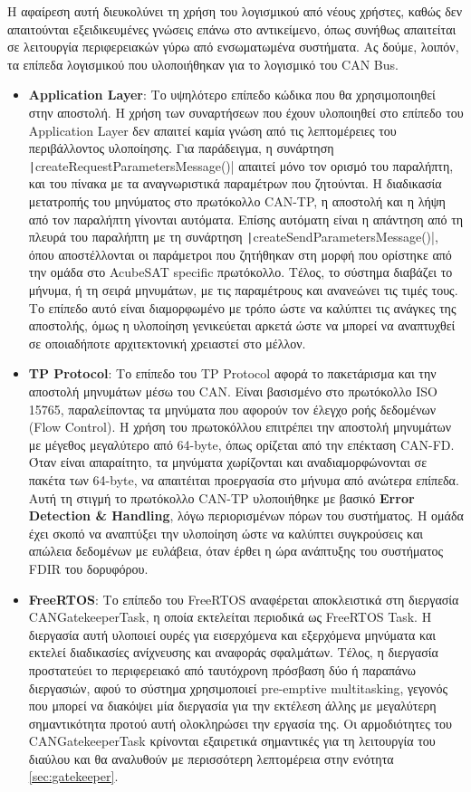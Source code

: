 \documentclass[a4paper,nobib,justified]{tufte-book}
\begin{document}
Η αφαίρεση αυτή διευκολύνει τη χρήση του λογισμικού από νέους χρήστες, καθώς δεν απαιτούνται εξειδικευμένες γνώσεις επάνω στο αντικείμενο, όπως συνήθως απαιτείται σε λειτουργία περιφερειακών γύρω από ενσωματωμένα συστήματα. Ας δούμε, λοιπόν, τα επίπεδα λογισμικού που υλοποιήθηκαν για το λογισμικό του CAN Bus.

\begin{itemize}
	\item \textbf{Application Layer}: Το υψηλότερο επίπεδο κώδικα που θα χρησιμοποιηθεί στην αποστολή. Η χρήση των συναρτήσεων που έχουν υλοποιηθεί στο επίπεδο του Application Layer δεν απαιτεί καμία γνώση από τις λεπτομέρειες του περιβάλλοντος υλοποίησης. Για παράδειγμα, η συνάρτηση \texttt|createRequestParametersMessage()| απαιτεί μόνο τον ορισμό του παραλήπτη, και του πίνακα με τα αναγνωριστικά παραμέτρων που ζητούνται. Η διαδικασία μετατροπής του μηνύματος στο πρωτόκολλο CAN-TP, η αποστολή και η λήψη από τον παραλήπτη γίνονται αυτόματα. Επίσης αυτόματη είναι η απάντηση από τη πλευρά του παραλήπτη με τη συνάρτηση \texttt|createSendParametersMessage()|, όπου αποστέλλονται οι παράμετροι που ζητήθηκαν στη μορφή που ορίστηκε από την ομάδα στο AcubeSAT specific πρωτόκολλο. Τέλος, το σύστημα διαβάζει το μήνυμα, ή τη σειρά μηνυμάτων, με τις παραμέτρους και ανανεώνει τις τιμές τους. Το επίπεδο αυτό είναι διαμορφωμένο με τρόπο ώστε να καλύπτει τις ανάγκες της αποστολής, όμως η υλοποίηση γενικεύεται αρκετά ώστε να μπορεί να αναπτυχθεί σε οποιαδήποτε αρχιτεκτονική χρειαστεί στο μέλλον.
	\item \textbf{TP Protocol}: Το επίπεδο του TP Protocol αφορά το πακετάρισμα και την αποστολή μηνυμάτων μέσω του CAN. Είναι βασισμένο στο πρωτόκολλο ISO 15765, παραλείποντας τα μηνύματα που αφορούν τον έλεγχο ροής δεδομένων (Flow Control). Η χρήση του πρωτοκόλλου επιτρέπει την αποστολή μηνυμάτων με μέγεθος μεγαλύτερο από 64-byte, όπως ορίζεται από την επέκταση CAN-FD. Όταν είναι απαραίτητο, τα μηνύματα χωρίζονται και αναδιαμορφώνονται σε πακέτα των 64-byte, να απαιτέιται προεργασία στο μήνυμα από ανώτερα επίπεδα. Αυτή τη στιγμή το πρωτόκολλο CAN-TP υλοποιήθηκε με βασικό \textbf{Error Detection \& Handling}, λόγω περιορισμένων πόρων του συστήματος. Η ομάδα έχει σκοπό να αναπτύξει την υλοποίηση ώστε να καλύπτει συγκρούσεις και απώλεια δεδομένων με ευλάβεια, όταν έρθει η ώρα ανάπτυξης του συστήματος FDIR του δορυφόρου.
	\item \textbf{FreeRTOS}: Το επίπεδο του FreeRTOS αναφέρεται αποκλειστικά στη διεργασία CANGatekeeperTask, η οποία εκτελείται περιοδικά ως FreeRTOS Task. Η διεργασία αυτή υλοποιεί ουρές για εισερχόμενα και εξερχόμενα μηνύματα και εκτελεί διαδικασίες ανίχνευσης και αναφοράς σφαλμάτων. Τέλος, η διεργασία προστατεύει το περιφερειακό από ταυτόχρονη πρόσβαση δύο ή παραπάνω διεργασιών, αφού το σύστημα χρησιμοποιεί pre-emptive multitasking, γεγονός που μπορεί να διακόψει μία διεργασία για την εκτέλεση άλλης με μεγαλύτερη σημαντικότητα προτού αυτή ολοκληρώσει την εργασία της. Οι αρμοδιότητες του CANGatekeeperTask κρίνονται εξαιρετικά σημαντικές για τη λειτουργία του διαύλου και θα αναλυθούν με περισσότερη λεπτομέρεια στην ενότητα \ref{sec:gatekeeper}.

\end{itemize}
\end{document}
